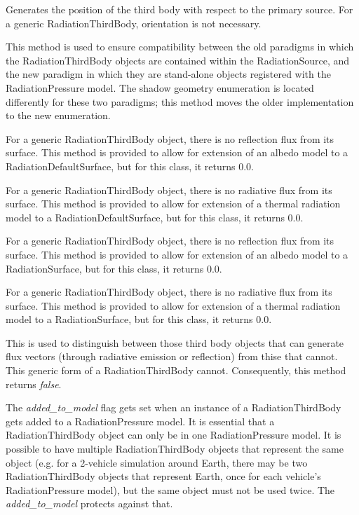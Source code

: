 {\begin{enumerate}
{\begin{enumerate}
Generates the position of the third body with respect to the primary source.
For a generic RadiationThirdBody, orientation is not necessary.

This method is used to ensure compatibility between the old paradigms in which
the RadiationThirdBody objects are contained within the RadiationSource, and
the new paradigm in which they are stand-alone objects registered with the
RadiationPressure model.  The shadow geometry enumeration is located
differently for these two paradigms; this method moves the older implementation
to the new enumeration.

For a generic RadiationThirdBody object, there is no reflection flux from its
surface.  This method is provided to allow for extension of an albedo model to
a RadiationDefaultSurface, but for this class, it returns 0.0.

For a generic RadiationThirdBody object, there is no radiative flux from its
surface.  This method is provided to allow for extension of a thermal radiation
model to a RadiationDefaultSurface, but for this class, it returns 0.0.

For a generic RadiationThirdBody object, there is no reflection flux from its
surface.  This method is provided to allow for extension of an albedo model to
a RadiationSurface, but for this class, it returns 0.0.

For a generic RadiationThirdBody object, there is no radiative flux from its
surface.  This method is provided to allow for extension of a thermal
radiation model to a RadiationSurface, but for this class, it returns 0.0.

This is used to distinguish between those third body objects that can generate
flux vectors (through radiative emission or reflection) from thise that cannot.
 This generic form of a RadiationThirdBody cannot.  Consequently, this method
 returns \textit{false}.

The \textit{added\_to\_model} flag gets set when an instance of a
RadiationThirdBody gets added to a RadiationPressure model.  It is essential
that a RadiationThirdBody object can only be in one RadiationPressure model.
It is possible to have multiple RadiationThirdBody objects that represent the
same object (e.g. for a 2-vehicle simulation around Earth, there may be two
RadiationThirdBody objects that represent Earth, once for each vehicle's
RadiationPressure model), but the same object must not be used twice.  The
\textit{added\_to\_model} protects against that.


\end{enumerate}}
\end{enumerate}}
